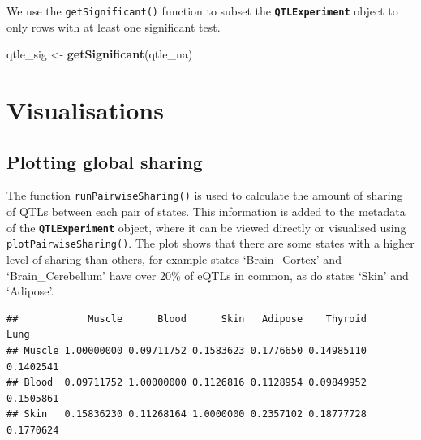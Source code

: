 \documentclass[
]{article}
\newenvironment{Shaded}{\begin{snugshade}}{\end{snugshade}}
\newcommand{\CommentTok}[1]{\textcolor[rgb]{0.56,0.35,0.01}{\textit{#1}}}
\newcommand{\DecValTok}[1]{\textcolor[rgb]{0.00,0.00,0.81}{#1}}
\newcommand{\FunctionTok}[1]{\textcolor[rgb]{0.13,0.29,0.53}{\textbf{#1}}}
\newcommand{\NormalTok}[1]{#1}
\newcommand{\OtherTok}[1]{\textcolor[rgb]{0.56,0.35,0.01}{#1}}
\newcommand{\SpecialCharTok}[1]{\textcolor[rgb]{0.81,0.36,0.00}{\textbf{#1}}}
\begin{document}
\normalsize

We use the \texttt{getSignificant()} function to subset the
\textbf{\texttt{QTLExperiment}} object to only rows with at least one
significant test.

\footnotesize

\begin{Shaded}
\begin{Highlighting}[]
\NormalTok{qtle\_sig }\OtherTok{\textless{}{-}} \FunctionTok{getSignificant}\NormalTok{(qtle\_na)}
\end{Highlighting}
\end{Shaded}

\normalsize

\section{Visualisations}\label{visualisations}

\subsection{Plotting global sharing}\label{plotting-global-sharing}

The function \texttt{runPairwiseSharing()} is used to calculate the
amount of sharing of QTLs between each pair of states. This information
is added to the metadata of the \textbf{\texttt{QTLExperiment}} object,
where it can be viewed directly or visualised using
\texttt{plotPairwiseSharing()}. The plot shows that there are some
states with a higher level of sharing than others, for example states
`Brain\_Cortex' and `Brain\_Cerebellum' have over 20\% of eQTLs in
common, as do states `Skin' and `Adipose'.

\footnotesize

\begin{Shaded}
\end{Shaded}

\begin{verbatim}
##            Muscle      Blood      Skin   Adipose    Thyroid      Lung
## Muscle 1.00000000 0.09711752 0.1583623 0.1776650 0.14985110 0.1402541
## Blood  0.09711752 1.00000000 0.1126816 0.1128954 0.09849952 0.1505861
## Skin   0.15836230 0.11268164 1.0000000 0.2357102 0.18777728 0.1770624
\end{verbatim}
\end{document}
